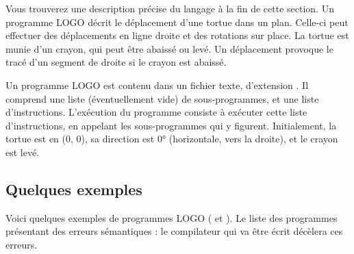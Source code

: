 Vous trouverez une description précise du langage à la fin de cette section. Un programme LOGO décrit le déplacement d'une tortue dans un plan. Celle-ci peut effectuer des déplacements en ligne droite et des rotations sur place. La tortue est munie d'un crayon, qui peut être abaissé ou levé. Un déplacement provoque le tracé d'un segment de droite si le crayon est abaissé.

Un programme LOGO est contenu dans un fichier texte, d'extension . Il comprend une liste (éventuellement vide) de sous-programmes, et une liste d'instructions. L'exécution du programme consiste à exécuter cette liste d'instructions, en appelant les sous-programmes qui y figurent. Initialement, la tortue est en (0, 0), sa direction est 0° (horizontale, vers la droite), et le crayon est levé.


\subsection{Quelques exemples}

Voici quelques exemples de programmes LOGO ( et ). Le  liste des programmes présentant des erreurs sémantiques : le compilateur qui va être écrit décèlera ces erreurs.



